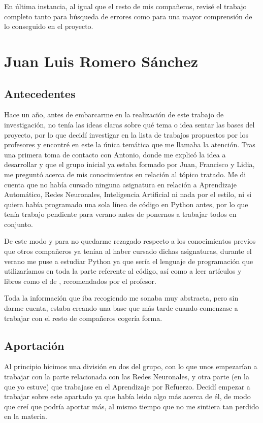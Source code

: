 En última instancia, al igual que el resto de mis compañeros, revisé el trabajo completo tanto para búsqueda de errores como para una mayor comprensión de lo conseguido en el proyecto.

\section{Juan Luis Romero Sánchez}

\subsection{Antecedentes}

Hace un año, antes de embarcarme en la realización de este trabajo de investigación, no tenía las ideas claras sobre qué tema o idea sentar las bases del proyecto, por lo que decidí investigar en la lista de trabajos propuestos por los profesores y encontré en este la única temática que me llamaba la atención. Tras una primera toma de contacto con Antonio, donde me explicó la idea a desarrollar y que el grupo inicial ya estaba formado por Juan, Francisco y Lidia, me preguntó acerca de mis conocimientos en relación al tópico tratado. Me di cuenta que no había cursado ninguna asignatura en relación a Aprendizaje Automático, Redes Neuronales, Inteligencia Artificial ni nada por el estilo, ni si quiera había programado una sola línea de código en Python antes, por lo que tenía trabajo pendiente para verano antes de ponernos a trabajar todos en conjunto.

De este modo y para no quedarme rezagado respecto a los conocimientos previos que otros compañeros ya tenían al haber cursado dichas asignaturas, durante el verano me puse a estudiar Python ya que sería el lenguaje de programación que utilizaríamos en toda la parte referente al código, así como a leer artículos \citep{mnih2013playing} \citep{Turing1950-TURCMA} \citep{Rodriguez2018} y libros como el de \citet{Buduma:general}, recomendados por el profesor. 

Toda la información que iba recogiendo me sonaba muy abstracta, pero sin darme cuenta, estaba creando una base que más tarde cuando comenzase a trabajar con el resto de compañeros cogería forma.

\subsection{Aportación}

Al principio hicimos una división en dos del grupo, con lo que unos empezarían a trabajar con la parte relacionada con las Redes Neuronales, y otra parte (en la que yo estuve) que trabajase en el Aprendizaje por Refuerzo. Decidí empezar a trabajar sobre este apartado ya que había leido algo más acerca de él, de modo que creí que podría aportar más, al mismo tiempo que no me sintiera tan perdido en la materia. 

